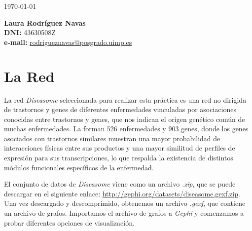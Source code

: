 \documentclass{uimppracticas}
\begin{document}
	
\frontmatter


\begin{center}
\large \today
\end{center}

\vspace{40mm}

\begin{flushright}
 	{\bf Laura Rodríguez Navas}\\
 	\textbf{DNI:} 43630508Z\\
 	\textbf{e-mail:} \href{rodrigueznavas@posgrado.uimp.es}{rodrigueznavas@posgrado.uimp.es}
\end{flushright}

\newpage



\mainmatter

\setlength\parskip{2.5ex}

\section*{La Red}

La red \textit{Diseasome}\cite{Goh8685} seleccionada para realizar esta práctica es una red no dirigida de trastornos y genes de diferentes enfermedades vinculadas por asociaciones conocidas entre trastornos y genes, que nos indican el origen genético común de muchas enfermedades. La forman 526 enfermedades y 903 genes, donde los genes asociados con trastornos similares muestran una mayor probabilidad de interacciones físicas entre sus productos y una mayor similitud de perfiles de expresión para sus transcripciones, lo que respalda la existencia de distintos módulos funcionales específicos de la enfermedad. 

El conjunto de datos de \textit{Diseasome} viene como un archivo \textit{.zip}, que se puede descargar en el siguiente enlace: \url{http://gephi.org/datasets/diseasome.gexf.zip}. Una vez descargado y descomprimido, obtenemos un archivo \textit{.gexf}, que contiene un archivo de grafos. Importamos el archivo de grafos a \textit{Gephi}\cite{Gephi} y comenzamos a probar diferentes opciones de visualización.
\end{document}
